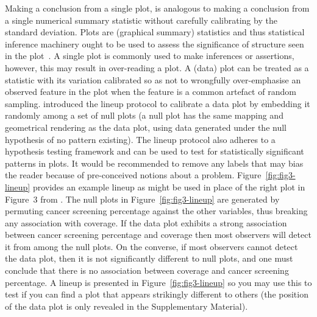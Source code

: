 \documentclass[ijds,nonblindrev]{informs-ijds}
\begin{document}
Making a conclusion from a single plot, is analogous to making a conclusion from a single numerical summary statistic without carefully calibrating by the standard deviation. Plots are (graphical summary) statistics and thus statistical inference machinery ought to be used to assess the significance of structure seen in the plot~\citep{wickham2010graphical}. A single plot is commonly used to make inferences or assertions, however, this may result in over-reading a plot. A (data) plot can be treated as a statistic with its variation calibrated so as not to wrongfully over-emphasise an observed feature in the plot when the feature is a common artefact of random sampling. \citet{buja2009statistical} introduced the lineup protocol to calibrate a data plot by embedding it randomly among a set of null plots (a null plot has the same mapping and geometrical rendering as the data plot, using data generated under the null hypothesis of no pattern existing). The lineup protocol also adheres to a hypothesis testing framework and can be used to test for statistically significant patterns in plots. It would be recommended to remove any labels that may bias the reader because of pre-conceived notions about a problem.  Figure~\ref{fig:fig3-lineup} provides an example lineup as might be used in place of the right plot in Figure~3 from \citet{basole2021}. The null plots in Figure~\ref{fig:fig3-lineup} are generated by permuting cancer screening percentage against the other variables, thus breaking any association with coverage. If the data plot exhibits a strong association between cancer screening percentage and coverage then most observers will detect it from among the null plots. On the converse, if most observers cannot detect the data plot, then it is not significantly different to null plots, and one must conclude that there is no association between coverage and cancer screening percentage. A lineup is presented in Figure~\ref{fig:fig3-lineup} so you may use this to test if you can find a plot that appears strikingly different to others (the position of the data plot is only revealed in the Supplementary Material).
\end{document}
